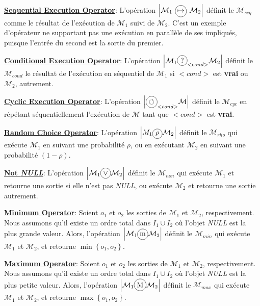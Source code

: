 \underline{\bf Sequential Execution Operator}: L'opération $\left|\mathcal{M}_1\poslop{\mapsto}\mathcal{M}_2\right|$ définit le \infr{\cm{}} $\mathcal{M}_{seq}$ comme le résultat de l'exécution de $\mathcal{M}_1$ suivi de $\mathcal{M}_2$. C'est un exemple d'opérateur ne  supportant pas une exécution en parallèle de ses \infr{\cms{}} impliqués, puisque l'entrée du second \infr{\cm{}} est la sortie du premier.

\underline{\bf Conditional Execution Operator}: L'opération $\left|\mathcal{M}_1\circled{?}_{<cond>}\mathcal{M}_2\right|$ définit le \cm{} $\mathcal{M}_{cond}$ le résultat de l'exécution en séquentiel de $\mathcal{M}_1$ si $<cond>$ est {\bf vrai} ou $\mathcal{M}_2$, autrement.

\underline{\bf Cyclic Execution Operator}: L'opération $\left|\circled{$\circlearrowleft$}_{<cond>}\mathcal{M}\right|$ définit le \cm{} $\mathcal{M}_{cyc}$ en répétant séquentiellement l'exécution de $\mathcal{M}$ tant que $<cond>$ est {\bf vrai}.

\underline{\bf Random Choice Operator}: L'opération $\left|M_1\circled{$\rho$}\mathcal{M}_2\right|$ définit le \cm{} $\mathcal{M}_{rho}$ qui exécute $\mathcal{M}_1$ en suivant une probabilité $\rho$, ou en exécutant $\mathcal{M}_2$ en suivant une probabilité $(1-\rho)$.

\underline{\bf Not {\it NULL}}: L'opération $\left|\mathcal{M}_1\circled{$\vee$}\mathcal{M}_2\right|$ définit le \cm{} $\mathcal{M}_{non}$ qui exécute $\mathcal{M}_1$ et retourne une sortie si elle n'est pas {\it NULL}, ou exécute $\mathcal{M}_2$ et retourne une sortie autrement.

\underline{\bf Minimum Operator}: Soient $o_1$ et $o_2$ les sorties de $\mathcal{M}_1$ et $\mathcal{M}_2$, respectivement. Nous assumons qu'il existe un ordre total dans $I_1 \cup I_2$ où l'objet \emph{NULL} est la plus grande valeur. Alors, l'opération $\left|\mathcal{M}_1\circled{m}\mathcal{M}_2\right|$ définit le \infr{\cm{}} $\mathcal{M}_{min}$ qui exécute $\mathcal{M}_1$ et $\mathcal{M}_2$, et retourne $\min\left\{o_1,o_2\right\}$.

\underline{\bf Maximum Operator}: Soient $o_1$ et $o_2$ les sorties de $\mathcal{M}_1$ et $\mathcal{M}_2$, respectivement. Nous assumons qu'il existe un ordre total dans $I_1 \cup I_2$ où l'objet \emph{NULL} est la plus petite valeur. Alors, l'opération $\left|\mathcal{M}_1\circled{M}\mathcal{M}_2\right|$ définit le \infr{\cm{}} $\mathcal{M}_{max}$ qui exécute $\mathcal{M}_1$ et $\mathcal{M}_2$, et retourne $\max\left\{o_1,o_2\right\}$.

